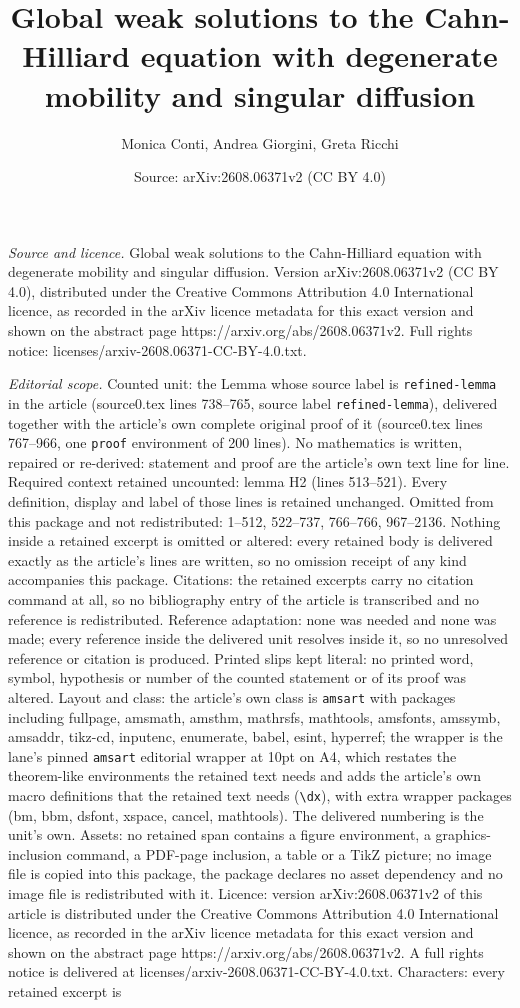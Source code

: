 \documentclass[10pt,a4paper]{amsart}
\title[Global weak solutions to the Cahn-Hilliard equation with deg]{Global weak solutions to the Cahn-Hilliard equation with degenerate mobility and singular diffusion}
\author{Monica Conti, Andrea Giorgini, Greta Ricchi}
\date{Source: arXiv:2608.06371v2 (CC BY 4.0)}
\begin{document}
\maketitle

\noindent\emph{Source and licence.} Global weak solutions to the Cahn-Hilliard equation with degenerate mobility and singular diffusion. Version arXiv:2608.06371v2 (CC BY 4.0), distributed under the Creative Commons Attribution 4.0 International licence, as recorded in the arXiv licence metadata for this exact version and shown on the abstract page https://arxiv.org/abs/2608.06371v2. Full rights notice: licenses/arxiv-2608.06371-CC-BY-4.0.txt.\par\smallskip

\noindent\textit{Editorial scope.} Counted unit: the Lemma whose source label is \texttt{refined-lemma} in the article (source0.tex lines 738--765, source label \texttt{refined-lemma}), delivered together with the article's own complete original proof of it (source0.tex lines 767--966, one \texttt{proof} environment of 200 lines). No mathematics is written, repaired or re-derived: statement and proof are the article's own text line for line. Required context retained uncounted: lemma H2 (lines 513--521). Every definition, display and label of those lines is retained unchanged. Omitted from this package and not redistributed: 1--512, 522--737, 766--766, 967--2136. Nothing inside a retained excerpt is omitted or altered: every retained body is delivered exactly as the article's lines are written, so no omission receipt of any kind accompanies this package. Citations: the retained excerpts carry no citation command at all, so no bibliography entry of the article is transcribed and no reference is redistributed. Reference adaptation: none was needed and none was made; every reference inside the delivered unit resolves inside it, so no unresolved reference or citation is produced. Printed slips kept literal: no printed word, symbol, hypothesis or number of the counted statement or of its proof was altered. Layout and class: the article's own class is \texttt{amsart} with packages including fullpage, amsmath, amsthm, mathrsfs, mathtools, amsfonts, amssymb, amsaddr, tikz-cd, inputenc, enumerate, babel, esint, hyperref; the wrapper is the lane's pinned \texttt{amsart} editorial wrapper at 10pt on A4, which restates the theorem-like environments the retained text needs and adds the article's own macro definitions that the retained text needs (\texttt{\textbackslash dx}), with extra wrapper packages (bm, bbm, dsfont, xspace, cancel, mathtools). The delivered numbering is the unit's own. Assets: no retained span contains a figure environment, a graphics-inclusion command, a PDF-page inclusion, a table or a TikZ picture; no image file is copied into this package, the package declares no asset dependency and no image file is redistributed with it. Licence: version arXiv:2608.06371v2 of this article is distributed under the Creative Commons Attribution 4.0 International licence, as recorded in the arXiv licence metadata for this exact version and shown on the abstract page https://arxiv.org/abs/2608.06371v2. A full rights notice is delivered at licenses/arxiv-2608.06371-CC-BY-4.0.txt. Characters: every retained excerpt is 
\end{document}
